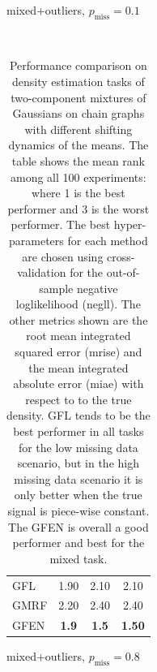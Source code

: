 \documentclass[a4paper, 11pt]{article}
\begin{document}
\begin{table}[tb]
\begin{subtable}[b]{.4\linewidth}
     \caption{mixed+outliers, $p_\text{miss} = 0.1$}
    \end{subtable}%
    ~
    \begin{subtable}[b]{.4\linewidth}
      \centering
      \begin{tabular}{l|c|c|c}
         GFL & 1.90 & 2.10 & 2.10 \\ 
         GMRF &  2.20  & 2.40  & 2.40 \\ 
         GFEN & \textbf{1.9} & \textbf{1.5} & \textbf{1.50} \\ 
      \end{tabular}
     \caption{mixed+outliers, $p_\text{miss} = 0.8$}
    \end{subtable}%
    \caption{Performance comparison on density estimation tasks of two-component mixtures of Gaussians on chain graphs with different shifting dynamics of the means. The table shows the mean rank among all 100 experiments: where 1 is the best performer and 3 is the worst performer. The best hyper-parameters for each method are chosen using cross-validation for the out-of-sample negative loglikelihood (negll). The other metrics shown are the root mean integrated squared error (mrise) and the mean integrated absolute error (miae) with respect to to the true density. GFL tends to be the best performer in all tasks for the low missing data scenario, but in the high missing data scenario it is only better when the true signal is piece-wise constant. The GFEN is overall a good performer and best for the mixed task.} 
    \label{tab:benchmarks}
\end{table}


\end{document}

